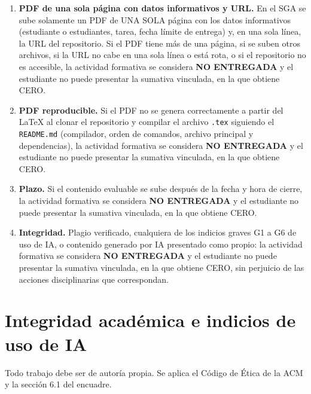 \documentclass[11pt]{article}
\newcommand{\seccion}[1]{\section{\textcolor{utegreendk}{#1}}}
\begin{document}
\begin{cajapiso}[title={Condiciones de entrega válida: su incumplimiento equivale a no entregar}]
	\begin{enumerate}[label=\textbf{P\arabic*.},leftmargin=24pt,itemsep=3pt]
		\item \textbf{PDF de una sola página con datos informativos y URL.} En el SGA se sube solamente un PDF de UNA SOLA página con los datos informativos (estudiante o estudiantes, tarea, fecha límite de entrega) y, en una sola línea, la URL del repositorio. Si el PDF tiene más de una página, si se suben otros archivos, si la URL no cabe en una sola línea o está rota, o si el repositorio no es accesible, la actividad formativa se considera \textbf{NO ENTREGADA} y el estudiante no puede presentar la sumativa vinculada, en la que obtiene CERO.
		\item \textbf{PDF reproducible.} Si el PDF no se genera correctamente a partir del \LaTeX{} al clonar el repositorio y compilar el archivo \texttt{.tex} siguiendo el \texttt{README.md} (compilador, orden de comandos, archivo principal y dependencias), la actividad formativa se considera \textbf{NO ENTREGADA} y el estudiante no puede presentar la sumativa vinculada, en la que obtiene CERO.
		\item \textbf{Plazo.} Si el contenido evaluable se sube después de la fecha y hora de cierre, la actividad formativa se considera \textbf{NO ENTREGADA} y el estudiante no puede presentar la sumativa vinculada, en la que obtiene CERO.
		\item \textbf{Integridad.} Plagio verificado, cualquiera de los indicios graves G1 a G6 de uso de IA, o contenido generado por IA presentado como propio: la actividad formativa se considera \textbf{NO ENTREGADA} y el estudiante no puede presentar la sumativa vinculada, en la que obtiene CERO, sin perjuicio de las acciones disciplinarias que correspondan.
	\end{enumerate}
\end{cajapiso}

\seccion{Integridad académica e indicios de uso de IA}

Todo trabajo debe ser de autoría propia. Se aplica el Código de Ética de la ACM \citep{acm_code_2018} y la sección 6.1 del encuadre.
\end{document}
